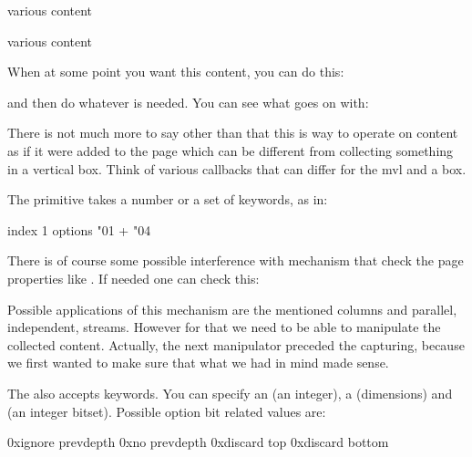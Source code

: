 \starttyping
{}
various content
\endmvl

various content
\endmvl
\stoptyping

When at some point you want this content, you can do this:

\starttyping
\setbox\scratchboxone{}
\setbox\scratchboxtwo{}
\stoptyping

and then do whatever is needed. You can see what goes on with:

\starttyping
{}
\stoptyping

There is not much more to say other than that this is way to operate on content
as if it were added to the page which can be different from collecting something
in a vertical box. Think of various callbacks that can differ for the mvl and a
box.

The \type {\beginmvl} primitive takes a number or a set of keywords, as in:

\starttyping
\beginmvl
    index   1
    options \numexpr "01 + "04\relax
\relax
\stoptyping

There is of course some possible interference with mechanism that check the page
properties like \type {\pagegoal}. If needed one can check this:

\starttyping
\ifcase\mvlcurrentlyactive
\or
\else
\fi
\stoptyping

Possible applications of this mechanism are the mentioned columns and parallel,
independent, streams. However for that we need to be able to manipulate the
collected content. Actually, the next manipulator preceded the capturing, because
we first wanted to make sure that what we had in mind made sense.

The  also accepts keywords. You can specify an  (an
integer), a  (dimensions) and  (an integer
bitset). Possible option bit related values are:

\starttabulate[|Tr|||]
\NC 0x\tohexadecimal\ignoreprevdepthmvloptioncode \NC ignore prevdepth \NC \type {\ignoreprevdepthmvloptioncode} \NC \NR
\NC 0x\tohexadecimal\noprevdepthmvloptioncode     \NC no prevdepth     \NC \type {\noprevdepthmvloptioncode    } \NC \NR
\NC 0x\tohexadecimal\discardtopmvloptioncode      \NC discard top      \NC \type {\discardtopmvloptioncode     } \NC \NR
\NC 0x\tohexadecimal\discardbottommvloptioncode   \NC discard bottom   \NC \type {\discardbottommvloptioncode  } \NC \NR
\stoptabulate

